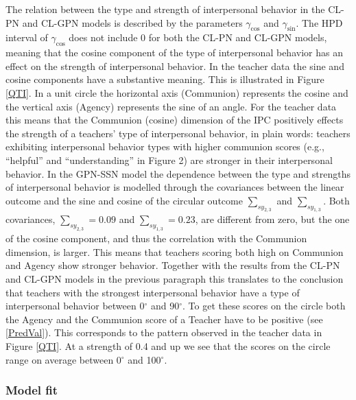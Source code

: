 \documentclass[man]{apa6}
\begin{document}
The relation between the type and strength of interpersonal behavior in the
CL-PN and CL-GPN models is described by the parameters \(\gamma_{\cos}\) and
\(\gamma_{\sin}\). The HPD interval of \(\gamma_{\cos}\) does not include 0 for
both the CL-PN and CL-GPN models, meaning that the cosine component of the type
of interpersonal behavior has an effect on the strength of interpersonal
behavior.\newline
\indent In the teacher data the sine and cosine components have a substantive
meaning. This is illustrated in Figure \ref{QTI}. In a unit circle the
horizontal axis (Communion) represents the cosine and the vertical axis
(Agency) represents the sine of an angle. For the teacher data this means that
the Communion (cosine) dimension of the IPC positively effects the strength of a
teachers' type of interpersonal behavior, in plain words: teachers exhibiting
interpersonal behavior types with higher communion scores (e.g., \enquote{helpful} and
\enquote{understanding} in Figure 2) are stronger in their interpersonal behavior.\newline 
\indent In the GPN-SSN model the dependence between the type and strengths of
interpersonal behavior is modelled through the covariances between the linear
outcome and the sine and cosine of the circular outcome \(\sum_{sy_{2,3}}\) and
\(\sum_{sy_{1,3}}\). Both covariances, \(\sum_{sy_{2,3}} = 0.09\) and
\(\sum_{sy_{1,3}} = 0.23\), are different from zero, but the one of the cosine
component, and thus the correlation with the Communion dimension, is larger.
This means that teachers scoring both high on Communion and Agency show stronger
behavior. Together with the results from the CL-PN and CL-GPN models in the
previous paragraph this translates to the conclusion that teachers with the
strongest interpersonal behavior have a type of interpersonal behavior between
0\(^\circ\) and 90\(^\circ\). To get these scores on the circle both the Agency and
the Communion score of a Teacher have to be positive (see \eqref{PredVal}). This
corresponds to the pattern observed in the teacher data in Figure \ref{QTI}. At
a strength of 0.4 and up we see that the scores on the circle range on average
between 0\(^\circ\) and 100\(^\circ\).

\subsubsection{Model fit}
\end{document}
